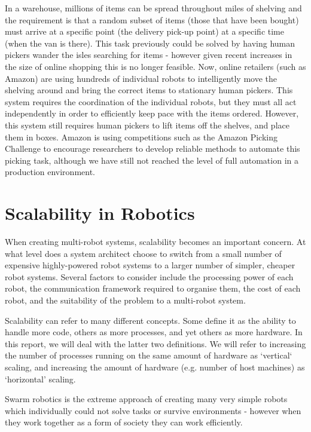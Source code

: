 \documentclass[../dissertation.tex]{subfiles}
\begin{document}
In a warehouse, millions of items can be spread throughout miles of shelving and the requirement is that a random subset of items (those that have been bought) must arrive at a specific point (the delivery pick-up point) at a specific time (when the van is there). This task previously could be solved by having human pickers wander the isles searching for items - however given recent increases in the size of online shopping this is no longer feasible. Now, online retailers (such as Amazon) are using hundreds of individual robots to intelligently move the shelving around and bring the correct items to stationary human pickers\cite{wurman2008coordinating}. This system requires the coordination of the individual robots, but they must all act independently in order to efficiently keep pace with the items ordered. However, this system still requires human pickers to lift items off the shelves, and place them in boxes. Amazon is using competitions such as the Amazon Picking Challenge to encourage researchers to develop reliable methods to automate this picking task\cite{correll2016lessons}, although we have still not reached the level of full automation in a production environment.

\section{Scalability in Robotics}
\label{background-scalability}

When creating multi-robot systems, scalability becomes an important concern\cite{klavins2004communication}. At what level does a system architect choose to switch from a small number of expensive highly-powered robot systems to a larger number of simpler, cheaper robot systems. Several factors to consider include the processing power of each robot, the communication framework required to organise them, the cost of each robot, and the suitability of the problem to a multi-robot system.

Scalability can refer to many different concepts. Some define it as the ability to handle more code, others as more processes, and yet others as more hardware\cite{Bondi:2000:CSI:350391.350432}. In this report, we will deal with the latter two definitions. We will refer to increasing the number of processes running on the same amount of hardware as `vertical` scaling, and increasing the amount of hardware (e.g. number of host machines) as `horizontal' scaling.

Swarm robotics is the extreme approach of creating many very simple robots which individually could not solve tasks or survive environments - however when they work together as a form of society they can work efficiently\cite{csahin2004swarm}.
\end{document}
